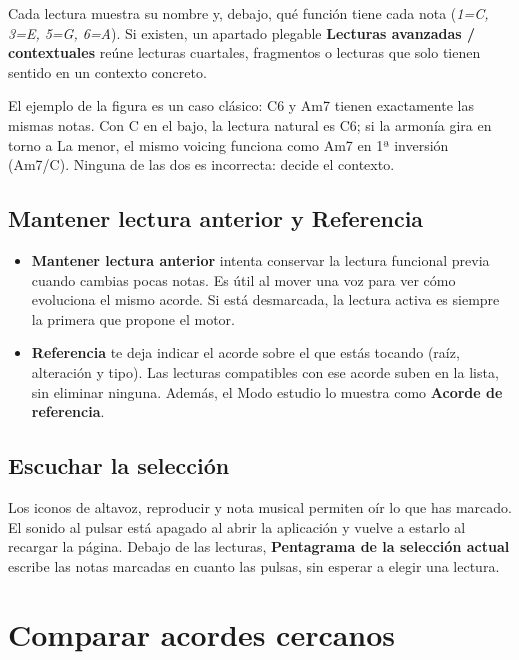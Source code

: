 \documentclass[a4paper,11pt,oneside]{report}
\providecommand{\tightlist}{\setlength{\itemsep}{2pt}\setlength{\parskip}{0pt}}
\begin{document}
Cada lectura muestra su nombre y, debajo, qué función tiene cada nota (\emph{1=C, 3=E, 5=G, 6=A}). Si existen, un apartado plegable \textbf{Lecturas avanzadas / contextuales} reúne lecturas cuartales, fragmentos o lecturas que solo tienen sentido en un contexto concreto.

El ejemplo de la figura es un caso clásico: C6 y Am7 tienen exactamente las mismas notas. Con C en el bajo, la lectura natural es C6; si la armonía gira en torno a La menor, el mismo voicing funciona como Am7 en 1ª inversión (Am7/C). Ninguna de las dos es incorrecta: decide el contexto.

\Needspace{3.5cm}
\section{Mantener lectura anterior y Referencia}\label{mantener-lectura-anterior-y-referencia}

\begin{itemize}
\tightlist
\item
  \textbf{Mantener lectura anterior} intenta conservar la lectura funcional previa cuando cambias pocas notas. Es útil al mover una voz para ver cómo evoluciona el mismo acorde. Si está desmarcada, la lectura activa es siempre la primera que propone el motor.
\item
  \textbf{Referencia} te deja indicar el acorde sobre el que estás tocando (raíz, alteración y tipo). Las lecturas compatibles con ese acorde suben en la lista, sin eliminar ninguna. Además, el Modo estudio lo muestra como \textbf{Acorde de referencia}.
\end{itemize}

\Needspace{3.5cm}
\section{Escuchar la selección}\label{escuchar-la-selecciuxf3n}

Los iconos de altavoz, reproducir y nota musical permiten oír lo que has marcado. El sonido al pulsar está apagado al abrir la aplicación y vuelve a estarlo al recargar la página. Debajo de las lecturas, \textbf{Pentagrama de la selección actual} escribe las notas marcadas en cuanto las pulsas, sin esperar a elegir una lectura.

\chapter{Comparar acordes cercanos}\label{comparar-acordes-cercanos}
\end{document}
